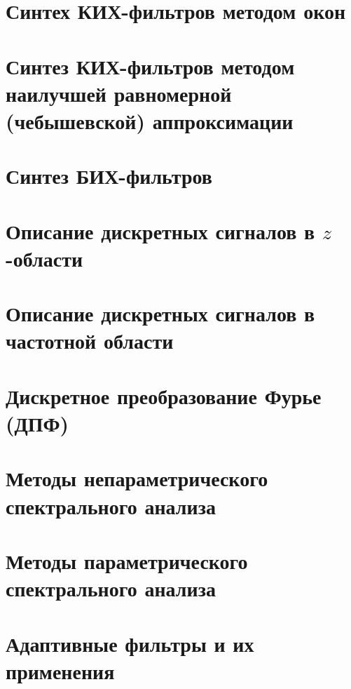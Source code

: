 \documentclass[a4paper, 14pt]{extarticle}
\begin{document}
\section{Синтех КИХ-фильтров методом окон}
\lipsum[1] %

\section{Синтез КИХ-фильтров методом наилучшей равномерной (чебышевской) аппроксимации}
\lipsum[1] %

\section{Синтез БИХ-фильтров}
\lipsum[1] %

\section{Описание дискретных сигналов в $z$-области}
\lipsum[1] %

\section{Описание дискретных сигналов в частотной области}
\lipsum[1] %

\section{Дискретное преобразование Фурье (ДПФ)}
\lipsum[1] %

\section{Методы непараметрического спектрального анализа}
\lipsum[1] %

\section{Методы параметрического спектрального анализа}
\lipsum[1] %

\section{Адаптивные фильтры и их применения}
\lipsum[1] %
\end{document}
